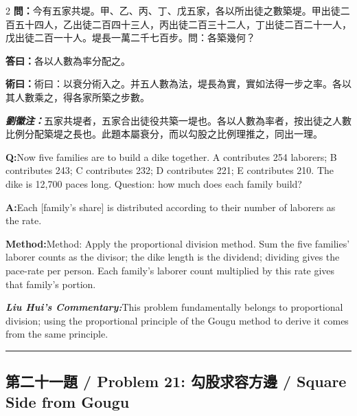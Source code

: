 \documentclass[11pt,a4paper]{article}
\newcommand{\cnwen}{\textcolor{cnlabelfg}{\textbf{問：}}}
\newcommand{\cnda}{\textbf{答曰：}}
\newcommand{\cnshu}{\textcolor{cnlabelfg}{\textbf{術曰：}}}
\newcommand{\cnzhu}{\textcolor{commentarycolor}{\textit{\textbf{劉徽注：}}}}
\newcommand{\enwen}{\textcolor{enlabelfg}{\textbf{Q:}}}
\newcommand{\enda}{\textcolor{enlabelfg}{\textbf{A:}}}
\newcommand{\enshu}{\textcolor{enlabelfg}{\textbf{Method:}}}
\newcommand{\enzhu}{\textcolor{enlabelfg}{\textit{\textbf{Liu Hui's Commentary:}}}}
\begin{document}
\begin{paracol}{2}
\switchcolumn[0]
\cnwen 今有五家共堤。甲、乙、丙、丁、戊五家，各以所出徒之數築堤。甲出徒二百五十四人，乙出徒二百四十三人，丙出徒二百三十二人，丁出徒二百二十一人，戊出徒二百一十人。堤長一萬二千七百步。問：各築幾何？

\cnda 各以人數為率分配之。

\cnshu 術曰：以衰分術入之。并五人數為法，堤長為實，實如法得一步之率。各以其人數乘之，得各家所築之步數。

\cnzhu 五家共堤者，五家合出徒役共築一堤也。各以人數為率者，按出徒之人數比例分配築堤之長也。此題本屬衰分，而以勾股之比例理推之，同出一理。

\switchcolumn[1]
\enwen Now five families are to build a dike together. A contributes 254 laborers; B contributes 243; C contributes 232; D contributes 221; E contributes 210. The dike is 12,700 paces long. Question: how much does each family build?

\enda Each [family's share] is distributed according to their number of laborers as the rate.

\enshu Method: Apply the proportional division method. Sum the five families' laborer counts as the divisor; the dike length is the dividend; dividing gives the pace-rate per person. Each family's laborer count multiplied by this rate gives that family's portion.

\enzhu This problem fundamentally belongs to proportional division; using the proportional principle of the Gougu method to derive it comes from the same principle.
\end{paracol}

\bigskip\hrule\bigskip

\subsection{第二十一題 / Problem 21: 勾股求容方邊 / Square Side from Gougu}
\end{document}
